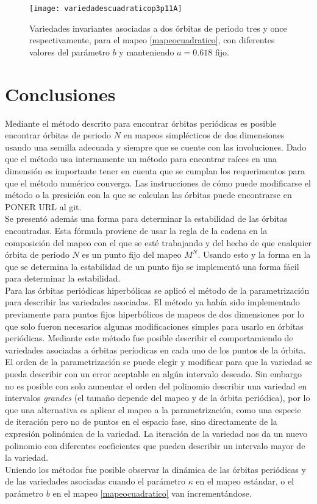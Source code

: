 \begin{figure}[H]
	\texttt{[image: variedadescuadraticop3p11A]}
	\caption{Variedades invariantes asociadas a dos \'orbitas de periodo tres y once respectivamente, para el mapeo \eqref{mapeocuadratico}, con diferentes valores del par\'ametro $b$ y manteniendo $a=0.618$ fijo.}
	\label{variedadescuadraticoper3per11vark}
\end{figure}
\section{Conclusiones}
Mediante el m\'etodo descrito para encontrar \'orbitas peri\'odicas es posible encontrar \'orbitas de periodo $N$ en mapeos simpl\'ecticos de dos dimensiones usando una semilla adecuada y siempre que se cuente con las involuciones. Dado que el m\'etodo usa internamente un m\'etodo para encontrar ra\'ices en una dimensi\'on es importante tener en cuenta que se cumplan los requerimentos para que el m\'etodo num\'erico converga. Las instrucciones de c\'omo puede modificarse el m\'etodo o la presici\'on con la que se calculan las \'orbitas puede encontrarse en PONER URL al git. \\

Se present\'o adem\'as una forma para determinar la estabilidad de las \'orbitas encontradas. Esta f\'ormula proviene de usar la regla de la cadena en la composici\'on del mapeo con el que se est\'e trabajando y del hecho de que cualquier \'orbita de periodo $N$ es un punto fijo del mapeo $M^{N}$. Usando esto y la forma en la que se determina la estabilidad de un punto fijo se implement\'o una forma f\'acil para determinar la estabilidad.\\

Para las \'orbitas peri\'odicas hiperb\'olicas se aplic\'o el m\'etodo de la parametrizaci\'on para describir las variedades asociadas. El m\'etodo ya hab\'ia sido implementado previamente para puntos fijos hiperb\'olicos de mapeos de dos dimensiones por lo que solo fueron necesarios algunas modificaciones simples para usarlo en \'orbitas peri\'odicas. Mediante este m\'etodo fue posible describir el comportamiendo de variedades asociadas a \'orbitas per\'iodicas en cada uno de los puntos de la \'orbita.\\

El orden de la parametrizaci\'on se puede elegir y modificar para que la variedad se pueda describir con un error aceptable en alg\'un intervalo deseado. Sin embargo no es posible con solo aumentar el orden del polinomio describir una variedad en intervalos \textit{grandes} (el tamaño depende del mapeo y de la \'orbita peri\'odica), por lo que una alternativa es aplicar el mapeo a la parametrizaci\'on, como una especie de iteraci\'on pero no de puntos en el espacio fase, sino directamente de la expresi\'on polin\'omica de la variedad. La iteraci\'on de la variedad nos da un nuevo polinomio con diferentes coeficientes que pueden describir un intervalo mayor de la variedad. \\

Uniendo los m\'etodos fue posible observar la din\'amica de las \'orbitas peri\'odicas y de las variedades asociadas cuando el par\'ametro $\kappa$ en el mapeo est\'andar, o el par\'ametro $b$ en el mapeo \eqref{mapeocuadratico} van increment\'andose. 







